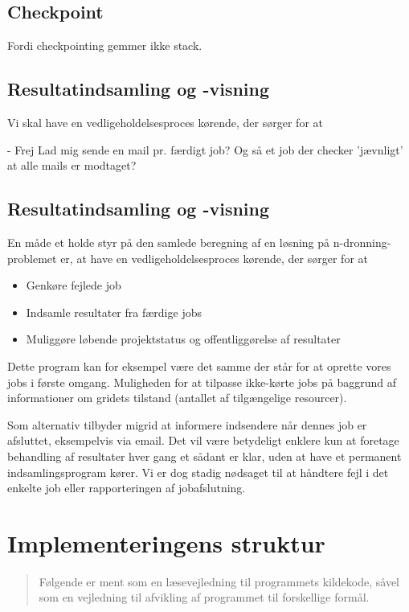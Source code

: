 \documentclass[final,a4paper,10pt]{article}
\begin{document}
\subsection{Checkpoint}

Fordi checkpointing gemmer ikke stack.


\subsection{Resultatindsamling og -visning}
Vi skal have en vedligeholdelsesproces kørende, der sørger for at 

- Frej Lad mig sende en mail pr. færdigt job? Og så et job der checker 'jævnligt' at alle mails er modtaget?


\subsection{Resultatindsamling og -visning}
En måde et holde styr på den samlede beregning af en løsning på n-dronning-problemet er, at have en vedligeholdelsesproces kørende, der sørger for at 
\begin{itemize}
	\item Genkøre fejlede job
	\item Indsamle resultater fra færdige jobs
	\item Muliggøre løbende projektstatus og offentliggørelse af resultater 
\end{itemize}
Dette program kan for eksempel være det samme der står for at oprette vores jobs i første omgang. Muligheden for at tilpasse ikke-kørte jobs på baggrund af informationer om gridets tilstand (antallet af tilgængelige resourcer). 

Som alternativ tilbyder migrid at informere indsendere når dennes job er afsluttet, eksempelvis via email. Det vil være betydeligt enklere kun at foretage behandling af resultater hver gang et sådant er klar, uden at have et permanent indsamlingsprogram kører. Vi er dog stadig nødsaget til at håndtere fejl i det enkelte job eller rapporteringen af jobafslutning. 



\section{Implementeringens struktur}\label{implementeringensstruktur}
\begin{verse}
	Følgende er ment som en læsevejledning til programmets kildekode, såvel som en vejledning til afvikling af programmet til forskellige formål. 
\end{verse}
\end{document}
